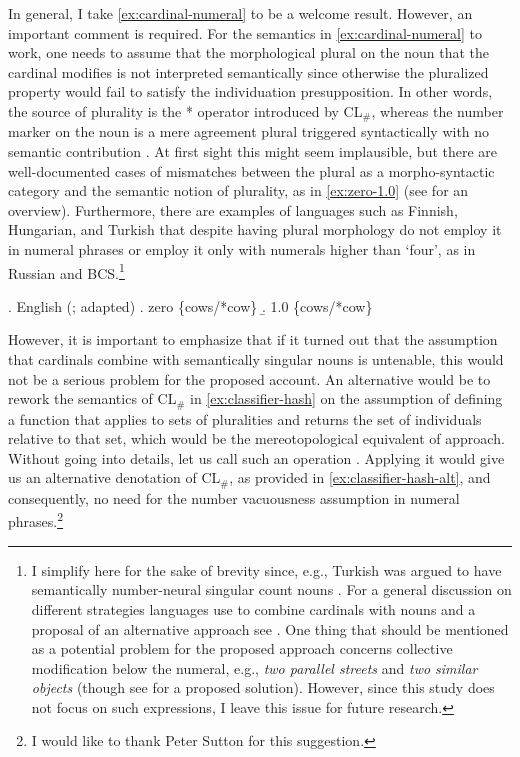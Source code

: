 	In general, I take \ref{ex:cardinal-numeral} to be a welcome result. However, an important comment is required. For the semantics in \ref{ex:cardinal-numeral} to work, one needs to assume that the morphological plural on the noun that the cardinal modifies is not interpreted semantically since otherwise the pluralized property would fail to satisfy the individuation presupposition. In other words, the source of plurality is the * operator introduced by CL$_\#$, whereas the number marker on the noun is a mere agreement plural triggered syntactically with no semantic contribution \citep[see][]{krifka1989nominal,ionin_matushansky2006composition}. At first sight this might seem implausible, but there are well-documented cases of mismatches between the plural as a morpho-syntactic category and the semantic notion of plurality, as in \ref{ex:zero-1.0} (see \citealt{nouwen2016plurality} for an overview). Furthermore, there are examples of languages such as Finnish, Hungarian, and Turkish that despite having plural morphology do not employ it in numeral phrases or employ it only with numerals higher than `four', as in Russian and BCS.\footnote{I simplify here for the sake of brevity since, e.g., Turkish was argued to have semantically number-neural singular count nouns \citep[e.g.,][]{gorgulu2012semantics}. For a general discussion on different strategies languages use to combine cardinals with nouns and a proposal of an alternative approach see \citet{bale_gagnon_khanjian2011crosslinguistic}. One thing that should be mentioned as a potential problem for the proposed approach concerns collective modification below the numeral, e.g., \textit{two parallel streets} and \textit{two similar objects} (though see \citealt{ionin_matushansky2018cardinals} for a proposed solution). However, since this study does not focus on such expressions, I leave this issue for future research.}
	
	\ex. English (\citealt{krifka1989nominal}; adapted)\label{ex:zero-1.0}
	\a. zero \{cows/*cow\}\label{ex:zero}
	\b. 1.0 \{cows/*cow\}\label{ex:1.0}
	
	However, it is important to emphasize that if it turned out that the assumption that cardinals combine with semantically singular nouns is untenable, this would not be a serious problem for the proposed account. An alternative would be to rework the semantics of CL$_\#$ in \ref{ex:classifier-hash} on the assumption of defining a function that applies to sets of pluralities and returns the set of  individuals relative to that set, which would be the mereotopological equivalent of  approach. Without going into details, let us call such an operation . Applying it would give us an alternative denotation of CL$_\#$, as provided in \ref{ex:classifier-hash-alt}, and consequently, no need for the number vacuousness assumption in numeral phrases.\footnote{I would like to thank Peter Sutton for this suggestion.} 
	
